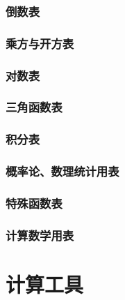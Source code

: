 \documentclass[UTF8]{../09-Mathematics}
\begin{document}
    \subsubsection{倒数表}
    \subsubsection{乘方与开方表}
    \subsubsection{对数表}
    \subsubsection{三角函数表}
    \subsubsection{积分表}
    \subsubsection{概率论、数理统计用表}
    \subsubsection{特殊函数表}
    \subsubsection{计算数学用表}
\section{计算工具}
\end{document}

